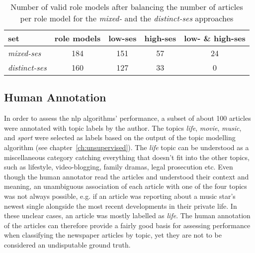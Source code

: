 \begin{table}
    \centering
    \begin{tabular}{lcccc}
        \toprule 
        set & role models & low-\gls{ses} & high-\gls{ses} & low- \& high-\gls{ses} \\ \toprule 
        \textit{mixed-\gls{ses}} & \SI{184}{} & \SI{151}{} & \SI{57}{} & \SI{24}{} \\
        \textit{distinct-\gls{ses}} & \SI{160}{} & \SI{127}{} & \SI{33}{} & \SI{0}{} \\
        \bottomrule
    \end{tabular}
    \caption{Number of valid role models after balancing the number of articles per role model for the \textit{mixed-} and the \textit{distinct-\gls{ses}} approaches}
    \label{tab:role_models_after_balancing}
\end{table}

\subsection*{Human Annotation}
In order to assess the \gls{nlp} algorithms' performance, a subset of about \SI{100}{} articles were annotated with topic labels by the author. The topics \textit{life}, \textit{movie}, \textit{music}, and \textit{sport} were selected as labels based on the output of the topic modelling algorithm (see chapter~\ref{ch:unsupervised}). The \textit{life} topic can be understood as a miscellaneous category catching everything that doesn't fit into the other topics, such as lifestyle, video-blogging, family dramas, legal prosecution etc. Even though the human annotator read the articles and understood their context and meaning, an unambiguous association of each article with one of the four topics was not always possible, e.g. if an article was reporting about a music star's newest single alongside the most recent developments in their private life. In these unclear cases, an article was mostly labelled as \textit{life}. The human annotation of the articles can therefore provide a fairly good basis for assessing performance when classifying the newspaper articles by topic, yet they are not to be considered an undisputable ground truth.

